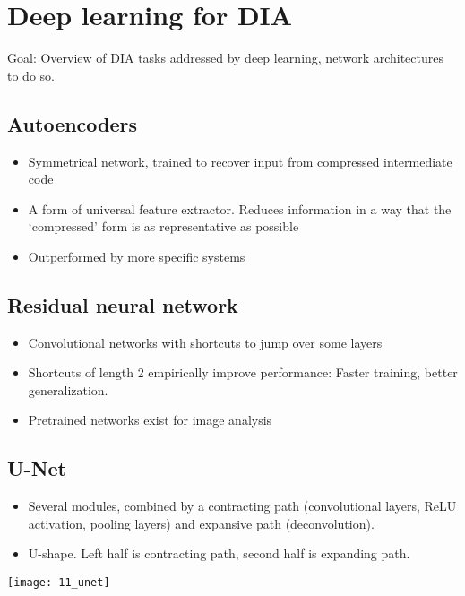 \section{Deep learning for DIA}

Goal: Overview of DIA tasks addressed by deep learning, network architectures
to do so.

\subsection{Autoencoders}

\begin{itemize}
		\item Symmetrical network, trained to recover input from compressed intermediate code
		\item A form of universal feature extractor. Reduces information in a
				way that the `compressed' form is as representative as possible
		\item Outperformed by more specific systems
\end{itemize}

\subsection{Residual neural network}

\begin{itemize}
		\item Convolutional networks with shortcuts to jump over some layers
		\item Shortcuts of length 2 empirically improve performance: Faster
				training, better generalization.
		\item Pretrained networks exist for image analysis
\end{itemize}

\subsection{U-Net}

\begin{itemize}
		\item Several modules, combined by a contracting path (convolutional
				layers, ReLU activation, pooling layers) and expansive path
				(deconvolution).
		\item U-shape. Left half is contracting path, second half is expanding
				path.
\end{itemize}

\texttt{[image: 11\_unet]}

